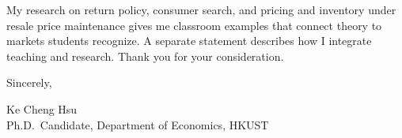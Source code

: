 \documentclass[11pt]{article}
\begin{document}
My research on return policy, consumer search, and pricing and inventory under resale price maintenance gives me classroom examples that connect theory to markets students recognize. A separate statement describes how I integrate teaching and research. Thank you for your consideration.

\vspace{1em}
Sincerely,

\vspace{1em}
Ke Cheng Hsu \\
Ph.D.\ Candidate, Department of Economics, HKUST
\end{document}
